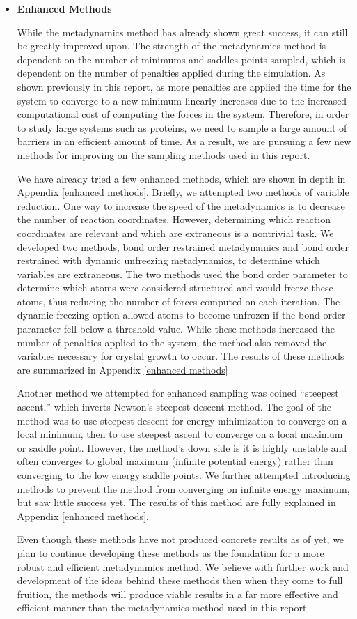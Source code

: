 \begin{itemize}
	\item \textbf{Enhanced Methods}
	
	While the metadynamics method has already shown great success, it can still be greatly improved upon.  The strength of the metadynamics method is dependent on the number of minimums and saddles points sampled, which is dependent on the number of penalties applied during the simulation.  As shown previously in this report, as more penalties are applied the time for the system to converge to a new minimum linearly increases due to the increased computational cost of computing the forces in the system.  Therefore, in order to study large systems such as proteins, we need to sample a large amount of barriers in an efficient amount of time.  As a result, we are pursuing a few new methods for improving on the sampling methods used in this report.  
	
	We have already tried a few enhanced methods, which are shown in depth in Appendix \ref{enhanced methods}.  Briefly, we attempted two methods of variable reduction.  One way to increase the speed of the metadynamics is to decrease the number of reaction coordinates.  However, determining which reaction coordinates are relevant and which are extraneous is a nontrivial task.  We developed two methods, bond order restrained metadynamics and bond order restrained with dynamic unfreezing metadynamics, to determine which variables are extraneous.  The two methods used the bond order parameter to determine which atoms were considered structured and would freeze these atoms, thus reducing the number of forces computed on each iteration.  The dynamic freezing option allowed atoms to become unfrozen if the bond order parameter fell below a threshold value.  While these methods increased the number of penalties applied to the system, the method also removed the variables necessary for crystal growth to occur.  The results of these methods are summarized in Appendix \ref{enhanced methods}  
	
	Another method we attempted for enhanced sampling was coined ``steepest ascent,'' which inverts Newton's steepest descent method.  The goal of the method was to use steepest descent for energy minimization to converge on a local minimum, then to use steepest ascent to converge on a local maximum or saddle point.  However, the method's down side is it is highly unstable and often converges to global maximum (infinite potential energy) rather than converging to the low energy saddle points.  We further attempted introducing methods to prevent the method from converging on infinite energy maximum, but saw little success yet. The results of this method are fully explained in Appendix \ref{enhanced methods}.  
	
	Even though these methods have not produced concrete results as of yet, we plan to continue developing these methods as the foundation for a more robust and efficient metadynamics method.  We believe with further work and development of the ideas behind these methods then when they come to full fruition, the methods will produce viable results in a far more effective and efficient manner than the metadynamics method used in this report.
\end{itemize}